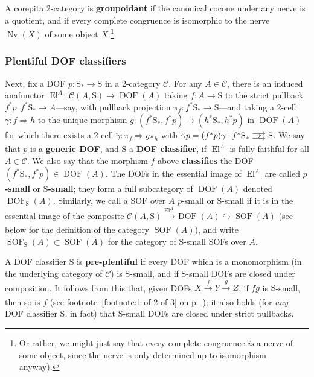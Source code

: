 \documentclass{amsart}
\newcommand\cC{\mathcal{C}}
\newcommand\defword[1]{{\boldmath \textbf{#1}}}
\newcommand\DOF{\operatorname{DOF}}
\newcommand\El{\operatorname{El}}
\newcommand\hto{\hookrightarrow}
\newcommand\Nv{\operatorname{Nv}}
\newcommand\rS{\mathrm{S}}
\newcommand\SOF{\operatorname{SOF}}
\newcommand\tocell{\hspace{-5pt}\begin{tikzcd}[column sep=15pt, ampersand replacement=\&]{}\ar[r, shift left=3pt, ""{name=top}]\ar[r, shift right=3pt, ""'{name=bot}, start anchor=east, end anchor=west]\&{}\ar[Rightarrow, from=top, to=bot, shorten=0.5pt]\end{tikzcd}\hspace{-5pt}}
\newcommand\tox[2][]{\xrightarrow[#1]{#2}}
\newcommand\To{\Rightarrow}
\newcommand\prerefpost[3]{%
  \texorpdfstring%
    {\hyperref[#2]{#1\ref*{#2}#3}}%
    {#1\ref*{#2}#3}%
}
\newcommand\pref[1]{\hyperref[#1]{p.~\pageref*{#1}}}
\theoremstyle{definition}
\theoremstyle{remark}
\theoremstyle{plainwithref}
\begin{document}
A corepita 2-category is \defword{groupoidant} if the canonical cocone under any nerve is a quotient, and if every complete congruence is isomorphic to the nerve \( \Nv(X) \) of some object \( X \).\footnote{%
  Or rather, we might just say that every complete congruence \emph{is} a nerve of some object, since the nerve is only determined up to isomorphism anyway).
}

\subsubsection{Plentiful DOF classifiers} \label{subsubsec:plenitude}
Next, fix a DOF \( p \colon \rS_* \to \rS \) in a 2-category \( \cC \).
For any \( A \in \cC \), there is an induced anafunctor \( \El^A \colon \cC(A, \rS) \to \DOF(A) \) taking \( f \colon A \to \rS \) to the strict pullback \( f^* p \colon f^* \rS_* \to A \)---say, with pullback projection \( \pi_f \colon f^* \rS_* \to \rS \)---and taking a 2-cell \( \gamma \colon f \To h \) to the unique morphism \( g \colon (f^* \rS_*, f^* p) \to (h^* \rS_*, h^* p) \) in \( \DOF(A) \) for which there exists a 2-cell \( \ddot \gamma \colon \pi_f \To g \pi_h \) with \( \ddot \gamma p = (f^* p) \gamma \colon f^* \rS_* \tocell \rS \).
We say that \( p \) is a \defword{generic DOF}, and \( \rS \) a \defword{DOF classifier}, if \( \El^A \) is fully faithful for all \( A \in \cC \).
We also say that the morphism \( f \) above \defword{classifies} the DOF \( (f^* \rS_*, f^* p) \in \DOF(A) \).
The DOFs in the essential image of \( \El^A \) are called \defword{\( p \)-small} or \defword{\( \rS \)-small}; they form a full subcategory of \( \DOF(A) \) denoted \( \DOF_\rS(A) \).
Similarly, we call a SOF over \( A \) \( p \)-small or \( \rS \)-small if it is in the essential image of the composite \( \cC(A, \rS) \tox{\El^A} \DOF(A) \hto \SOF(A) \) (see below for the definition of the category \( \SOF(A) \)), and write \( \SOF_\rS(A) \subset \SOF(A) \) for the category of \( \rS \)-small SOFs over \( A \).

A DOF classifier \( \rS \) is \defword{pre-plentiful} if every DOF which is a monomorphism (in the underlying category of \( \cC \)) is \( \rS \)-small, and if \( \rS \)-small DOFs are closed under composition.
It follows from this that, given DOFs \( X \tox{f} Y \tox{g} Z \), if \( f g \) is \( \rS \)-small, then so is \( f \) (see \prerefpost{footnote~}{footnote:1-of-2-of-3}{} on \pref{footnote:1-of-2-of-3}); it also holds (for \emph{any} DOF classifier \( \rS \), in fact) that \( \rS \)-small DOFs are closed under strict pullbacks.
\end{document}
